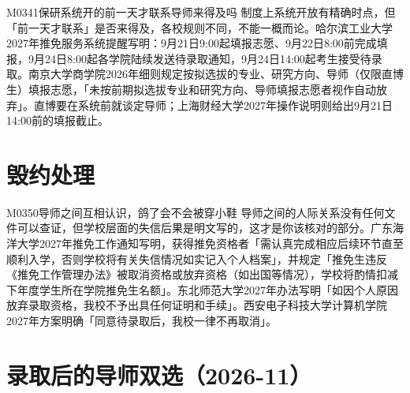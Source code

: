 \begin{qa}{M0341}{保研系统开的前一天才联系导师来得及吗}
制度上系统开放有精确时点，但「前一天才联系」是否来得及，各校规则不同，不能一概而论。哈尔滨工业大学2027年推免服务系统提醒写明：9月21日9:00起填报志愿、9月22日8:00前完成填报，9月24日8:00起各学院陆续发送待录取通知，9月24日14:00起考生接受待录取。南京大学商学院2026年细则规定按拟选拔的专业、研究方向、导师（仅限直博生）填报志愿，「未按前期拟选拔专业和研究方向、导师填报志愿者视作自动放弃」。直博要在系统前就谈定导师；上海财经大学2027年操作说明则给出9月21日14:00前的填报截止。
\end{qa}

\section{毁约处理}
\begin{qa}{M0350}{导师之间互相认识，鸽了会不会被穿小鞋}
导师之间的人际关系没有任何文件可以查证，但学校层面的失信后果是明文写的，这才是你该核对的部分。广东海洋大学2027年推免工作通知写明，获得推免资格者「需认真完成相应后续环节直至顺利入学，否则学校将有关失信情况如实记入个人档案」，并规定「推免生违反《推免工作管理办法》被取消资格或放弃资格（如出国等情况），学校将酌情扣减下年度学生所在学院推免生名额」。东北师范大学2027年办法写明「如因个人原因放弃录取资格，我校不予出具任何证明和手续」。西安电子科技大学计算机学院2027年方案明确「同意待录取后，我校一律不再取消」。
\end{qa}

\section{录取后的导师双选（2026-11）}

